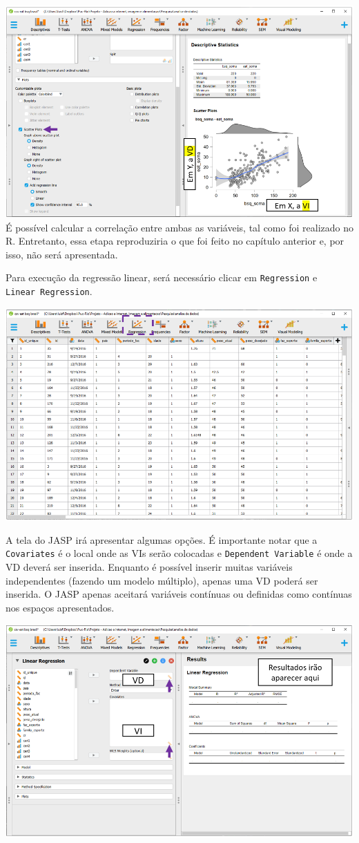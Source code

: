 \documentclass[
]{book}
\begin{document}
\includegraphics{./img/cap_reg_plot2.png}
É possível calcular a correlação entre ambas as variáveis, tal como foi realizado no R. Entretanto, essa etapa reproduziria o que foi feito no capítulo anterior e, por isso, não será apresentada.

Para execução da regressão linear, será necessário clicar em \texttt{Regression} e \texttt{Linear\ Regression}.

\includegraphics{./img/cap_reg_multipla_interface.png}

A tela do JASP irá apresentar algumas opções. É importante notar que a \texttt{Covariates} é o local onde as VIs serão colocadas e \texttt{Dependent\ Variable} é onde a VD deverá ser inserida. Enquanto é possível inserir muitas variáveis independentes (fazendo um modelo múltiplo), apenas uma VD poderá ser inserida. O JASP apenas aceitará variáveis contínuas ou definidas como contínuas nos espaços apresentados.

\includegraphics{./img/cap_reg_interface.png}
\end{document}
